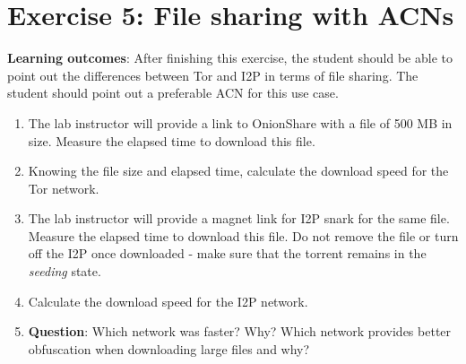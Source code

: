 \section*{Exercise 5: File sharing with ACNs}
\textbf{Learning outcomes}: After finishing this exercise, the student should be able to point out the differences between Tor and I2P in terms of file sharing. The student should point out a preferable ACN for this use case.
\begin{enumerate}
    \item The lab instructor will provide a link to OnionShare with a file of 500 MB in size. Measure the elapsed time to download this file.
    \item Knowing the file size and elapsed time, calculate the download speed for the Tor network.
    \item The lab instructor will provide a magnet link for I2P snark for the same file. Measure the elapsed time to download this file. Do not remove the file or turn off the I2P once downloaded - make sure that the torrent remains in the \textit{ seeding} state.
    \item Calculate the download speed for the I2P network.
    \item \textbf{Question}: Which network was faster? Why? Which network provides better obfuscation when downloading large files and why?
\end{enumerate}